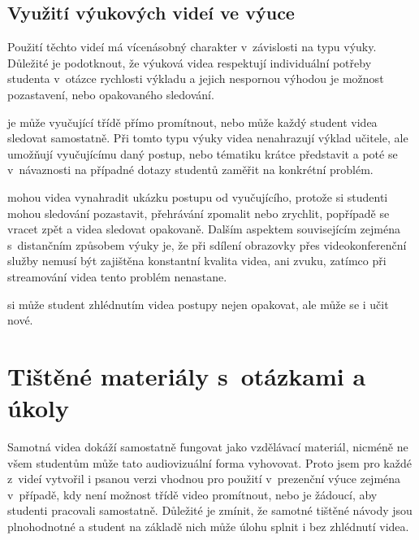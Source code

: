 \subsection{Využití výukových videí ve výuce}
Použití těchto videí má vícenásobný charakter v~závislosti na typu výuky. 
Důležité je podotknout, že výuková videa respektují individuální potřeby studenta v~otázce rychlosti výkladu a jejich nespornou výhodou je možnost pozastavení, nebo opakovaného sledování.

\noindent{} je může vyučující třídě přímo promítnout, nebo může každý student videa sledovat samostatně. Při tomto typu výuky videa nenahrazují výklad učitele, ale umožňují vyučujícímu daný postup, nebo tématiku krátce představit a poté se v~návaznosti na případné dotazy studentů zaměřit na konkrétní problém.

\noindent{} mohou videa vynahradit ukázku postupu od vyučujícího, protože si studenti mohou sledování pozastavit, přehrávání zpomalit nebo zrychlit, popřípadě se vracet zpět a videa sledovat opakovaně. 
Dalším aspektem souvisejícím zejména s~distančním způsobem výuky je, že při sdílení obrazovky přes videokonferenční služby nemusí být zajištěna konstantní kvalita videa, ani zvuku, zatímco při streamování videa tento problém nenastane. 

\noindent{} si může student zhlédnutím videa postupy nejen opakovat, ale může se i učit nové. 

\section{Tištěné materiály s~otázkami a úkoly}
Samotná videa dokáží samostatně fungovat jako vzdělávací materiál, nicméně ne všem studentům může tato audiovizuální forma vyhovovat.
Proto jsem pro každé z~videí vytvořil i psanou verzi vhodnou pro použití v~prezenční výuce zejména v~případě, kdy není možnost třídě video promítnout, nebo je žádoucí, aby studenti pracovali samostatně. 
Důležité je zmínit, že samotné tištěné návody jsou plnohodnotné a student na základě nich může úlohu splnit i bez zhlédnutí videa. 

